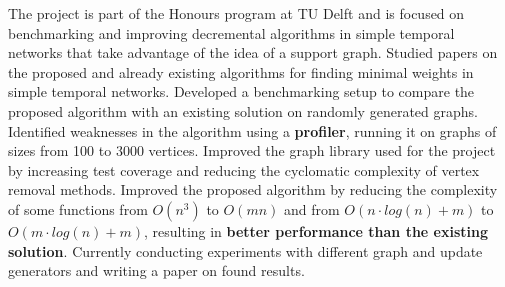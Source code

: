     \vspace{6pt}
    \small{\newline{} The project is part of the Honours program at TU Delft and is focused on benchmarking and improving decremental algorithms in simple temporal networks that take advantage of the idea of a support graph.}
    \vspace{-4pt}
        \resumeItemListStart
            \subItemOfItem
            {Studied papers on the proposed and already existing algorithms for finding minimal weights in simple temporal networks.}
            \subItemOfItem
            {Developed a benchmarking setup to compare the proposed algorithm with an existing solution on randomly generated graphs.}
            \subItemOfItem
            {Identified weaknesses in the algorithm using a \textbf{profiler}, running it on graphs of sizes from 100 to 3000 vertices.}
            \subItemOfItem
            {Improved the graph library used for the project by increasing test coverage and reducing the cyclomatic complexity of vertex removal methods.}
            \subItemOfItem
            {Improved the proposed algorithm by reducing the complexity of some functions from $O(n^3)$ to $O(mn)$ and from $O(n\cdot log(n) + m)$ to $O(m\cdot log(n) + m)$, resulting in \textbf{better performance than the existing solution}.}
            \subItemOfItem
            {Currently conducting experiments with different graph and update generators and writing a paper on found results.}
        \resumeItemListEnd